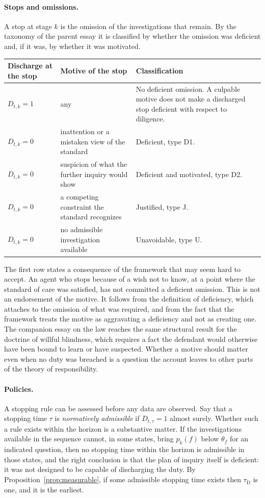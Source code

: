 \documentclass[11pt]{article}
\newcommand{\tD}{\tau_{\mathrm D}}
\theoremstyle{plain}
\theoremstyle{definition}
\begin{document}
\paragraph{Stops and omissions.} A stop at stage $k$ is the omission of the investigations that remain. By the taxonomy of the parent essay it is classified by whether the omission was deficient and, if it was, by whether it was motivated.

\begin{center}
\small
\begin{tabular}{@{}p{}p{}p{}@{}}
\hline
Discharge at the stop & Motive of the stop & Classification\\
\hline
$D_{t,k}=1$ & any & No deficient omission. A culpable motive does not make a discharged stop deficient with respect to diligence.\\
$D_{t,k}=0$ & inattention or a mistaken view of the standard & Deficient, type D1.\\
$D_{t,k}=0$ & suspicion of what the further inquiry would show & Deficient and motivated, type D2.\\
$D_{t,k}=0$ & a competing constraint the standard recognizes & Justified, type J.\\
$D_{t,k}=0$ & no admissible investigation available & Unavoidable, type U.\\
\hline
\end{tabular}
\end{center}

The first row states a consequence of the framework that may seem hard to accept. An agent who stops because of a wish not to know, at a point where the standard of care was satisfied, has not committed a deficient omission. This is not an endorsement of the motive. It follows from the definition of deficiency, which attaches to the omission of what was required, and from the fact that the framework treats the motive as aggravating a deficiency and not as creating one. The companion essay on the law \cite{flyxion2026law} reaches the same structural result for the doctrine of willful blindness, which requires a fact the defendant would otherwise have been bound to learn or have suspected. Whether a motive should matter even when no duty was breached is a question the account leaves to other parts of the theory of responsibility.

\paragraph{Policies.} A stopping rule can be assessed before any data are observed. Say that a stopping time $\tau$ is \emph{normatively admissible} if $D_{t,\tau}=1$ almost surely. Whether such a rule exists within the horizon is a substantive matter. If the investigations available in the sequence cannot, in some states, bring $p_k(f)$ below $\theta_f$ for an indicated question, then no stopping time within the horizon is admissible in those states, and the right conclusion is that the plan of inquiry itself is deficient: it was not designed to be capable of discharging the duty. By Proposition~\ref{prop:measurable}, if some admissible stopping time exists then $\tD$ is one, and it is the earliest.
\end{document}
